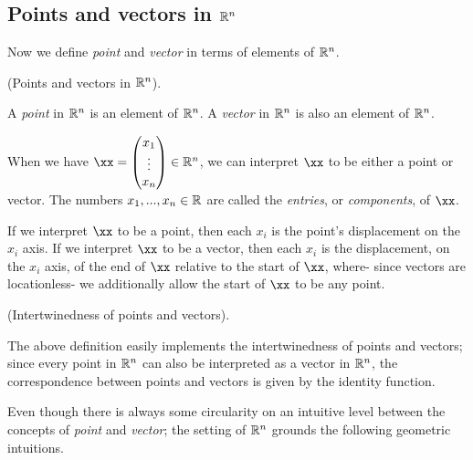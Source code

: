 \newpage

\subsection*{Points and vectors in $\mathbb{R}^n$}

Now we define \textit{point} and \textit{vector} in terms of elements of $\mathbb{R}^n$.

\begin{defn}
    (Points and vectors in $\mathbb{R}^n$).
    
    A \textit{point} in $\mathbb{R}^n$ is an element of $\mathbb{R}^n$. A \textit{vector} in $\mathbb{R}^n$ is also an element of $\mathbb{R}^n$.
    
    When we have $\xx = \begin{pmatrix} x_1 \\ \vdots \\ x_n \end{pmatrix} \in \R^n$, we can interpret $\xx$ to be either a point or vector. The numbers $x_1, ..., x_n \in \mathbb{R}$ are called the \textit{entries}, or \textit{components}, of $\xx$.
    
    If we interpret $\xx$ to be a point, then each $x_i$ is the point's displacement on the $x_i$ axis. If we interpret $\xx$ to be a vector, then each $x_i$ is the displacement, on the $x_i$ axis, of the end of $\xx$ relative to the start of $\xx$, where- since vectors are locationless- we additionally allow the start of $\xx$ to be any point.
\end{defn}

\begin{remark}
    (Intertwinedness of points and vectors).
    
    The above definition easily implements the intertwinedness of points and vectors; since every point in $\mathbb{R}^n$ can also be interpreted as a vector in $\mathbb{R}^n$, the correspondence between points and vectors is given by the identity function.
\end{remark}

Even though there is always some circularity on an intuitive level between the concepts of \textit{point} and \textit{vector}; the setting of $\mathbb{R}^n$ grounds the following geometric intuitions.

